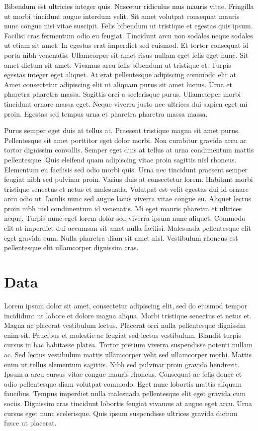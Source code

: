 \documentclass[12pt, oneside, a4paper]{article}
\begin{document}
Bibendum est ultricies integer quis. Nascetur ridiculus mus mauris vitae. Fringilla ut morbi tincidunt augue interdum velit. Sit amet volutpat consequat mauris nunc congue nisi vitae suscipit. Felis bibendum ut tristique et egestas quis ipsum. Facilisi cras fermentum odio eu feugiat. Tincidunt arcu non sodales neque sodales ut etiam sit amet. In egestas erat imperdiet sed euismod. Et tortor consequat id porta nibh venenatis. Ullamcorper sit amet risus nullam eget felis eget nunc. Sit amet dictum sit amet. Vivamus arcu felis bibendum ut tristique et. Turpis egestas integer eget aliquet. At erat pellentesque adipiscing commodo elit at. Amet consectetur adipiscing elit ut aliquam purus sit amet luctus. Urna et pharetra pharetra massa. Sagittis orci a scelerisque purus. Ullamcorper morbi tincidunt ornare massa eget. Neque viverra justo nec ultrices dui sapien eget mi proin. Egestas sed tempus urna et pharetra pharetra massa massa.

Purus semper eget duis at tellus at. Praesent tristique magna sit amet purus. Pellentesque sit amet porttitor eget dolor morbi. Non curabitur gravida arcu ac tortor dignissim convallis. Semper eget duis at tellus at urna condimentum mattis pellentesque. Quis eleifend quam adipiscing vitae proin sagittis nisl rhoncus. Elementum eu facilisis sed odio morbi quis. Urna nec tincidunt praesent semper feugiat nibh sed pulvinar proin. Varius duis at consectetur lorem. Habitant morbi tristique senectus et netus et malesuada. Volutpat est velit egestas dui id ornare arcu odio ut. Iaculis nunc sed augue lacus viverra vitae congue eu. Aliquet lectus proin nibh nisl condimentum id venenatis. Mi eget mauris pharetra et ultrices neque. Turpis nunc eget lorem dolor sed viverra ipsum nunc aliquet. Commodo elit at imperdiet dui accumsan sit amet nulla facilisi. Malesuada pellentesque elit eget gravida cum. Nulla pharetra diam sit amet nisl. Vestibulum rhoncus est pellentesque elit ullamcorper dignissim cras.

\section*{Data}
Lorem ipsum dolor sit amet, consectetur adipiscing elit, sed do eiusmod tempor incididunt ut labore et dolore magna aliqua. Morbi tristique senectus et netus et. Magna ac placerat vestibulum lectus. Placerat orci nulla pellentesque dignissim enim sit. Faucibus et molestie ac feugiat sed lectus vestibulum. Blandit turpis cursus in hac habitasse platea. Tortor pretium viverra suspendisse potenti nullam ac. Sed lectus vestibulum mattis ullamcorper velit sed ullamcorper morbi. Mattis enim ut tellus elementum sagittis. Nibh sed pulvinar proin gravida hendrerit. Ipsum a arcu cursus vitae congue mauris rhoncus. Consequat ac felis donec et odio pellentesque diam volutpat commodo. Eget nunc lobortis mattis aliquam faucibus. Tempus imperdiet nulla malesuada pellentesque elit eget gravida cum sociis. Dignissim cras tincidunt lobortis feugiat vivamus at augue eget arcu. Urna cursus eget nunc scelerisque. Quis ipsum suspendisse ultrices gravida dictum fusce ut placerat.
\end{document}
